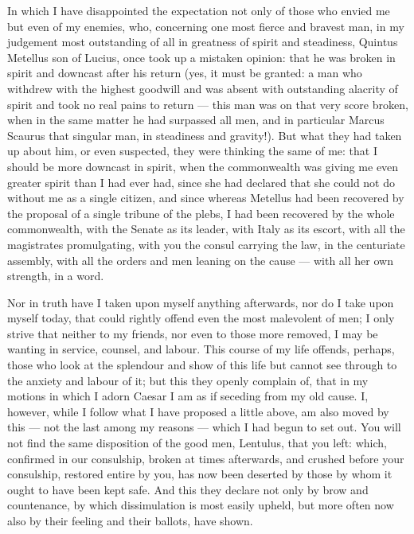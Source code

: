  In which I have disappointed the expectation not only of those who envied me but even of my enemies, who, concerning one most fierce and bravest man, in my judgement most outstanding of all in greatness of spirit and steadiness, Quintus Metellus son of Lucius, once took up a mistaken opinion: that he was broken in spirit and downcast after his return (yes, it must be granted: a man who withdrew with the highest goodwill and was absent with outstanding alacrity of spirit and took no real pains to return --- this man was on that very score broken, when in the same matter he had surpassed all men, and in particular Marcus Scaurus that singular man, in steadiness and gravity!). But what they had taken up about him, or even suspected, they were thinking the same of me: that I should be more downcast in spirit, when the commonwealth was giving me even greater spirit than I had ever had, since she had declared that she could not do without me as a single citizen, and since whereas Metellus had been recovered by the proposal of a single tribune of the plebs, I had been recovered by the whole commonwealth, with the Senate as its leader, with Italy as its escort, with all the magistrates promulgating, with you the consul carrying the law, in the centuriate assembly, with all the orders and men leaning on the cause --- with all her own strength, in a word.

 Nor in truth have I taken upon myself anything afterwards, nor do I take upon myself today, that could rightly offend even the most malevolent of men; I only strive that neither to my friends, nor even to those more removed, I may be wanting in service, counsel, and labour. This course of my life offends, perhaps, those who look at the splendour and show of this life but cannot see through to the anxiety and labour of it; but this they openly complain of, that in my motions in which I adorn Caesar I am as if seceding from my old cause. I, however, while I follow what I have proposed a little above, am also moved by this --- not the last among my reasons --- which I had begun to set out. You will not find the same disposition of the good men, Lentulus, that you left: which, confirmed in our consulship, broken at times afterwards, and crushed before your consulship, restored entire by you, has now been deserted by those by whom it ought to have been kept safe. And this they declare not only by brow and countenance, by which dissimulation is most easily upheld, but more often now also by their feeling and their ballots, have shown.

